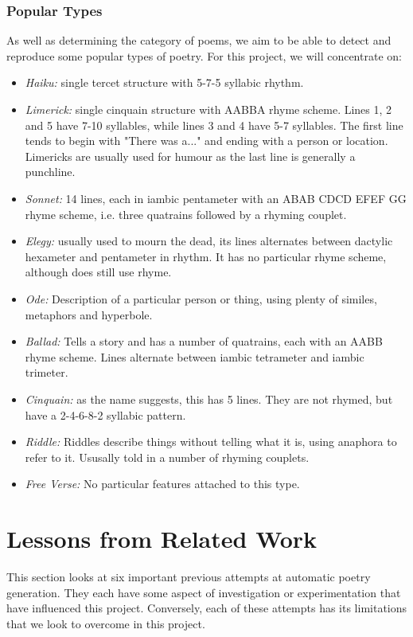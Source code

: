 \subsubsection{Popular Types}
As well as determining the category of poems, we aim to be able to detect and reproduce some popular types of poetry. For this project, we will concentrate on:
\begin{itemize}
\item{\textit{Haiku:} single tercet structure with 5-7-5 syllabic rhythm.}
\item{\textit{Limerick:} single cinquain structure with AABBA rhyme scheme. Lines 1, 2 and 5 have 7-10 syllables, while lines 3 and 4 have 5-7 syllables. The first line tends to begin with "There was a..." and ending with a person or location. Limericks are usually used for humour as the last line is generally a punchline.}
\item{\textit{Sonnet:} 14 lines, each in iambic pentameter with an ABAB CDCD EFEF GG rhyme scheme, i.e. three quatrains followed by a rhyming couplet.}
\item{\textit{Elegy:} usually used to mourn the dead, its lines alternates between dactylic hexameter and pentameter in rhythm. It has no particular rhyme scheme, although does still use rhyme. }
\item{\textit{Ode:} Description of a particular person or thing, using plenty of similes, metaphors and hyperbole.}
\item{\textit{Ballad:} Tells a story and has a number of quatrains, each with an AABB rhyme scheme. Lines alternate between iambic tetrameter and iambic trimeter.}
\item{\textit{Cinquain:} as the name suggests, this has 5 lines. They are not rhymed, but have a 2-4-6-8-2 syllabic pattern. }
\item{\textit{Riddle:} Riddles describe things without telling what it is, using anaphora to refer to it. Ususally told in a number of rhyming couplets.}
\item{\textit{Free Verse:} No particular features attached to this type.}
\end{itemize} 


\section{Lessons from Related Work}
\label{sec:related_work}
This section looks at six important previous attempts at automatic poetry generation. They each have some aspect of investigation or experimentation that have influenced this project. Conversely, each of these attempts has its limitations that we look to overcome in this project.

